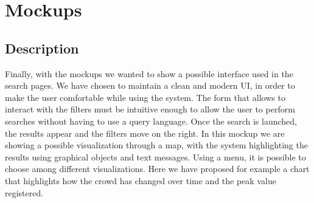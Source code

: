 \documentclass[../main.tex]{subfiles}
\begin{document}
    \chapter{Mockups}\label{ch:mockups}
    \section{Description}\label{sec:description3}
    Finally, with the mockups we wanted to show a possible interface used in the search pages. We have chosen to maintain a clean and modern UI, in order to make the user comfortable while using the system. The form that allows to interact with the filters must be intuitive enough to allow the user to perform searches without having to use a query language.
    Once the search is launched, the results appear and the filters move on the right. In this mockup we are showing a possible visualization through a map, with the system highlighting the results using graphical objects and text messages.
    Using a menu, it is possible to choose among different visualizations. Here we have proposed for example a chart that highlights how the crowd has changed over time and the peak value registered.
\end{document}

